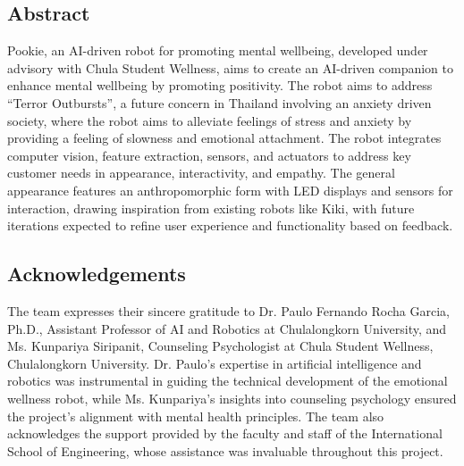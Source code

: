 \documentclass[a4paper,10pt]{article}
\begin{document}
\newpage
\begin{center}
    \item\section*{Abstract}
\end{center}
\large
Pookie, an AI-driven robot for promoting mental wellbeing, developed under advisory with
Chula Student Wellness, aims to create an AI-driven companion to enhance mental wellbeing by promoting positivity. The robot aims to address “Terror Outbursts”, a future
concern in Thailand involving an anxiety driven society, where the robot aims to alleviate
feelings of stress and anxiety by providing a feeling of slowness and emotional attachment.
The robot integrates computer vision, feature extraction, sensors, and actuators to address
key customer needs in appearance, interactivity, and empathy. The general appearance
features an anthropomorphic form with LED displays and sensors for interaction, drawing
inspiration from existing robots like Kiki, with future iterations expected to
refine user experience and functionality based on feedback.
\newpage
\begin{center}
    \item\section*{Acknowledgements}
\end{center}
The team expresses their sincere gratitude to Dr. Paulo Fernando Rocha Garcia, Ph.D., Assistant Professor of AI and Robotics at Chulalongkorn University, and Ms. Kunpariya Siripanit, Counseling Psychologist at Chula Student Wellness, Chulalongkorn University. Dr. Paulo’s expertise in artificial intelligence and robotics was instrumental in guiding the technical development of the emotional wellness robot, while Ms. Kunpariya’s insights into counseling psychology ensured the project’s alignment with mental health principles. The team also acknowledges the support provided by the faculty and staff of the International School of Engineering, whose assistance was invaluable throughout this project. 
\normalsize

\newpage
\tableofcontents

\newpage

\newpage    

\newpage

\newpage

\newpage

\newpage

\newpage

\newpage


\newpage
{}


\end{document}
